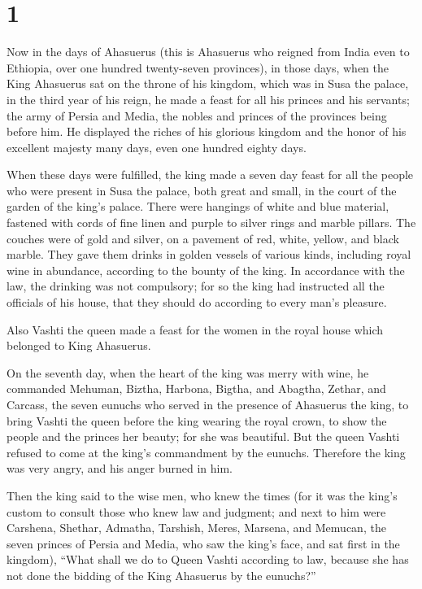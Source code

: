 \hypertarget{section}{%
\section{1}\label{section}}

 Now in the days of Ahasuerus (this is Ahasuerus who
reigned from India even to Ethiopia, over one hundred twenty-seven
provinces),  in those days, when the King Ahasuerus sat on
the throne of his kingdom, which was in Susa the palace, 
in the third year of his reign, he made a feast for all his princes and
his servants; the army of Persia and Media, the nobles and princes of
the provinces being before him.  He displayed the riches
of his glorious kingdom and the honor of his excellent majesty many
days, even one hundred eighty days.

 When these days were fulfilled, the king made a seven day
feast for all the people who were present in Susa the palace, both great
and small, in the court of the garden of the king's palace.
 There were hangings of white and blue material, fastened
with cords of fine linen and purple to silver rings and marble pillars.
The couches were of gold and silver, on a pavement of red, white,
yellow, and black marble.  They gave them drinks in golden
vessels of various kinds, including royal wine in abundance, according
to the bounty of the king.  In accordance with the law,
the drinking was not compulsory; for so the king had instructed all the
officials of his house, that they should do according to every man's
pleasure.

 Also Vashti the queen made a feast for the women in the
royal house which belonged to King Ahasuerus.

 On the seventh day, when the heart of the king was merry
with wine, he commanded Mehuman, Biztha, Harbona, Bigtha, and Abagtha,
Zethar, and Carcass, the seven eunuchs who served in the presence of
Ahasuerus the king,  to bring Vashti the queen before the
king wearing the royal crown, to show the people and the princes her
beauty; for she was beautiful.  But the queen Vashti
refused to come at the king's commandment by the eunuchs. Therefore the
king was very angry, and his anger burned in him.

 Then the king said to the wise men, who knew the times
(for it was the king's custom to consult those who knew law and
judgment;  and next to him were Carshena, Shethar,
Admatha, Tarshish, Meres, Marsena, and Memucan, the seven princes of
Persia and Media, who saw the king's face, and sat first in the
kingdom),  ``What shall we do to Queen Vashti according
to law, because she has not done the bidding of the King Ahasuerus by
the eunuchs?''

